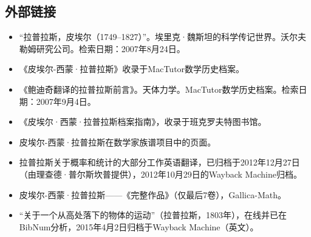\subsection{外部链接}
\begin{itemize}
\item “拉普拉斯，皮埃尔（1749–1827）”。埃里克·魏斯坦的科学传记世界。沃尔夫勒姆研究公司。检索日期：2007年8月24日。  
\item 《皮埃尔-西蒙·拉普拉斯》收录于MacTutor数学历史档案。  
\item 《鲍迪奇翻译的拉普拉斯前言》。天体力学。MacTutor数学历史档案。检索日期：2007年9月4日。  
\item 《皮埃尔·西蒙·拉普拉斯档案指南》，收录于班克罗夫特图书馆。  
\item 皮埃尔-西蒙·拉普拉斯在数学家族谱项目中的页面。  
\item 拉普拉斯关于概率和统计的大部分工作英语翻译，已归档于2012年12月27日（由理查德·普尔斯坎普提供），2012年10月29日的Wayback Machine归档。  
\item 皮埃尔-西蒙·拉普拉斯——《完整作品》（仅最后7卷），Gallica-Math。  
\item “关于一个从高处落下的物体的运动”（拉普拉斯，1803年），在线并已在BibNum分析，2015年4月2日归档于Wayback Machine（英文）。
\end{itemize}